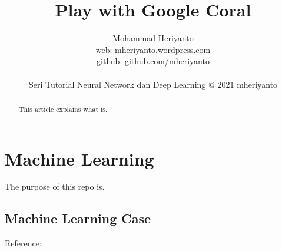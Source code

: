 \documentclass[12pt,oneside,a4paper]{article}
\begin{document}
\title{Play with Google Coral}
\author{Mohammad Heriyanto \\web: \href{https://mheriyanto.wordpress.com//}{mheriyanto.wordpress.com} \\ github: \href{https://github.com/mheriyanto}{github.com/mheriyanto} \\~\\ Seri Tutorial Neural Network dan Deep Learning @ 2021 mheriyanto}
   
\maketitle

\begin{abstract}
This article explains what is.
\end{abstract}

\section{Machine Learning}
The purpose of this repo is.

\subsection{Machine Learning Case}

Reference: 
\end{document}
